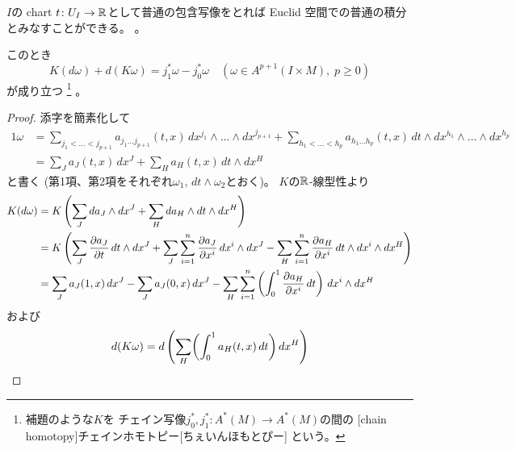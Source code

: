 \documentclass[report]{jlreq}
\begin{document}
\begin{lemma}[ホモトピー作用素$K$]
\begin{enumerate}
{                $I$の chart $t \colon U_I \to \mathbb{R}$として普通の包含写像をとれば
                Euclid 空間での普通の積分とみなすことができる。
            }
            。
    \end{enumerate}
    このとき
    \begin{equation}
        K(d\omega) + d(K\omega) = j_1^* \omega - j_0^* \omega
        \quad
        (\omega \in A^{p + 1}(I \times M), \; p \ge 0)
    \end{equation}
    が成り立つ
    \footnote{
        補題のような$K$を
        チェイン写像$j_0^*, j_1^* \colon A^*(M) \to A^*(M)$の間の
        [chain homotopy]{チェインホモトピー}[ちぇいんほもとぴー]
        という。
    }
    。
\end{lemma}

\begin{proof}
    添字を簡素化して
    \begin{alignat}{1}
        \omega
            &= \sum_{j_1 < \dots < j_{p + 1}}
                a_{j_1 \dots j_{p + 1}}(t, x) \, dx^{j_1} \wedge \dots \wedge dx^{j_{p + 1}}
                + \sum_{h_1 < \dots < h_p}
                a_{h_1 \dots h_p}(t, x) \, dt \wedge dx^{h_1} \wedge \dots \wedge dx^{h_p} \\
            &= \sum_{J} a_J(t, x) \, dx^J
                + \sum_{H} a_H(t, x) \, dt \wedge dx^H
    \end{alignat}
    と書く (第1項、第2項をそれぞれ$\omega_1, \, dt \wedge \omega_2$とおく)。
    $K$の$\mathbb{R}$-線型性より
    \begin{alignat}{1}
        K(d\omega)
            &= K \myparen{
                \sum_{J} da_J \wedge dx^J
                + \sum_{H} da_H \wedge dt \wedge dx^H
            } \\
            &= K \myparen{
                \sum_{J} \deldel[a_J]{t} \, dt \wedge dx^J
                + \sum_{J} \sum_{i = 1}^n \deldel[a_J]{x^i} \, dx^i \wedge dx^J
                - \sum_{H} \sum_{i = 1}^n \deldel[a_H]{x^i} \, dt \wedge dx^i \wedge dx^H
            } \\
            &= \sum_{J} a_J(1, x) \, dx^J - \sum_{J} a_J(0, x) \, dx^J
                - \sum_{H} \sum_{i = 1}^n \myparen{
                    \int_0^1 \deldel[a_H]{x^i} \, dt
                } \, dx^i \wedge dx^H
    \end{alignat}
    および
    \begin{alignat}{1}
        d(K\omega)
            &= d \myparen{
                \sum_{H} \biggl( \int_0^1 a_H(t, x) \, dt \biggr) \, dx^H
            } \\

\end{alignat}
\end{proof}
\end{document}
